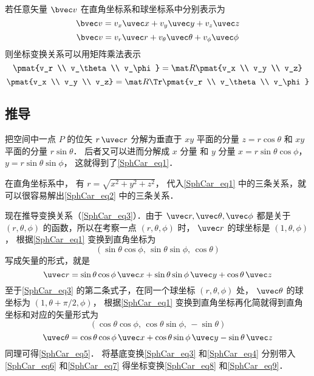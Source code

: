 若任意矢量 $\bvec v$ 在直角坐标系和球坐标系中分别表示为
\begin{equation}\label{SphCar_eq7}
\bvec v = v_x \uvec x + v_y \uvec y + v_z \uvec z
\end{equation}
\begin{equation}\label{SphCar_eq6}
\bvec v = v_r \uvec r + v_\theta \uvec \theta + v_\phi \uvec \phi
\end{equation}
则坐标变换关系可以用矩阵乘法表示
\begin{equation}\label{SphCar_eq9}
\pmat{v_r \\ v_\theta \\ v_\phi}
= \mat R \pmat{v_x \\ v_y \\ v_z}
\end{equation}
\begin{equation}\label{SphCar_eq8}
\pmat{v_x \\ v_y \\ v_z}
= \mat R\Tr \pmat{v_r \\ v_\theta \\ v_\phi}
\end{equation}

\subsection{推导}
把空间中一点 $P$ 的位矢 $r \,\uvec r$ 分解为垂直于 $xy$ 平面的分量 $z = r\cos \theta $ 和 $xy$ 平面的分量 $r\sin \theta $． 后者又可以进而分解成 $x$ 分量 和 $y$ 分量  $x = r\sin \theta \cos \phi$，  $y = r\sin \theta \sin \phi$， 这就得到了\autoref{SphCar_eq1}．

在直角坐标系中， 有 $r = \sqrt {x^2 + y^2 + z^2}$， 代入\autoref{SphCar_eq1} 中的三条关系，就可以很容易解出\autoref{SphCar_eq2} 中的三条关系．

现在推导变换关系（\autoref{SphCar_eq3}）．由于 $\uvec r,\uvec \theta ,\uvec \phi $ 都是关于 $(r, \theta, \phi)$ 的函数，所以在考察一点 $(r, \theta, \phi)$ 时， $\uvec r$ 的球坐标是 $(1, \theta, \phi)$，  根据\autoref{SphCar_eq1} 变换到直角坐标为
\begin{equation}
(\sin \theta \cos \phi,\,\sin \theta \sin \phi,\,\cos \theta)
\end{equation}
写成矢量的形式，就是
 \begin{equation}
\uvec r = \sin \theta \cos \phi \,\uvec x + \sin \theta \sin \phi \,\uvec y + \cos \theta \,\uvec z
\end{equation}
至于\autoref{SphCar_eq3} 的第二条式子，在同一个球坐标 $(r,\theta ,\phi)$ 处， $\uvec \theta $ 的球坐标为 $(1, \theta + \pi /2, \phi)$， 根据\autoref{SphCar_eq1} 变换到直角坐标再化简就得到直角坐标和对应的矢量形式为
\begin{equation}
(\cos \theta \cos \phi ,\,\cos \theta \sin \phi , \,- \sin \theta)
\end{equation}
\begin{equation}
\uvec \theta  = \cos \theta \cos \phi \,\uvec x + \cos \theta \sin \phi \,\uvec y - \sin \theta \,\uvec z
\end{equation}
同理可得\autoref{SphCar_eq5}． 将基底变换\autoref{SphCar_eq3} 和\autoref{SphCar_eq4} 分别带入\autoref{SphCar_eq6} 和\autoref{SphCar_eq7} 得坐标变换\autoref{SphCar_eq8} 和\autoref{SphCar_eq9}．
